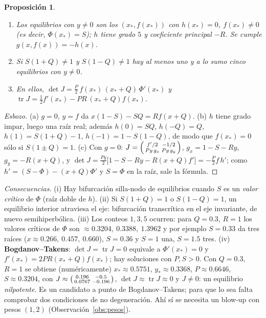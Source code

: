 \documentclass[11pt,a4paper]{article}
\newcommand{\tr}{\operatorname{tr}}
\theoremstyle{plain}
\newtheorem{proposicion}[teorema]{Proposición}
\theoremstyle{definition}
\theoremstyle{remark}
\begin{document}
\begin{proposicion}\label{prop:interior}
\begin{enumerate}[label=(\alph*)]
\item Los equilibrios con $y\ne0$ son los $(x_*,f(x_*))$ con $h(x_*)=0$, $f(x_*)\ne0$ (es decir, $\Phi(x_*)=S$); $h$ tiene grado $5$ y coeficiente principal $-R$. Se cumple $g(x,f(x))=-h(x)$.
\item Si $S(1+Q)\ne1$ y $S(1-Q)\ne1$ hay al menos uno y a lo sumo cinco equilibrios con $y\neq0$.
\item En ellos, $\det J=\tfrac P2\,f(x_*)\,(x_*+Q)\,\Phi'(x_*)$ y $\tr J=\tfrac12f'(x_*)-PR\,(x_*+Q)f(x_*)$.
\end{enumerate}
\end{proposicion}

\begin{proof}[Esbozo]
(a) $g=0$, $y=f$ da $x(1-S)-SQ=Rf(x+Q)$. (b) $h$ tiene grado impar, luego una raíz real; además $h(0)=SQ$, $h(-Q)=Q$, $h(1)=S(1+Q)-1$, $h(-1)=1-S(1-Q)$, de modo que $f(x_*)=0$ sólo si $S(1\pm Q)=1$. (c) Con $g=0$: $J=\begin{psmallmatrix}f'/2&-1/2\\Py\,g_x&Py\,g_y\end{psmallmatrix}$, $g_x=1-S-Ry$, $g_y=-R(x+Q)$, y $\det J=\tfrac{Py}2\big[1-S-Ry-R(x+Q)f'\big]=-\tfrac P2f\,h'$; como $h'=(S-\Phi)-(x+Q)\Phi'$ y $S=\Phi$ en la raíz, sale la fórmula.
\end{proof}

\emph{Consecuencias.} (i) Hay bifurcación silla-nodo de equilibrios cuando $S$ es un \emph{valor crítico} de $\Phi$ (raíz doble de $h$). (ii) Si $S(1+Q)=1$ o $S(1-Q)=1$, un equilibrio interior atraviesa el eje: bifurcación transcrítica en el eje invariante, de nuevo semihiperbólica. (iii) Los conteos $1,3,5$ ocurren: para $Q=0.3$, $R=1$ los valores críticos de $\Phi$ son $\approx0.3204,\ 0.3388,\ 1.3962$ y por ejemplo $S=0.33$ da tres raíces ($x\approx0.266,\ 0.457,\ 0.660$), $S=0.36$ y $S=1$ una, $S=1.5$ tres. (iv) \textbf{Bogdanov--Takens}: $\det J=\tr J=0$ equivale a $\Phi'(x_*)=0$ y $f'(x_*)=2PR(x_*+Q)f(x_*)$; hay soluciones con $P,S>0$. Con $Q=0.3$, $R=1$ se obtiene (numéricamente) $x_*\approx0.5751$, $y_*\approx0.3368$, $P\approx0.6646$, $S\approx0.3204$, con $J\approx\begin{psmallmatrix}0.196&-0.5\\0.0767&-0.196\end{psmallmatrix}$, $\det J\approx\tr J\approx0$ y $J\neq0$: un equilibrio \emph{nilpotente}. Es un candidato a punto de Bogdanov--Takens; para que lo sea falta comprobar dos condiciones de no degeneración. Ahí sí se necesita un blow-up con pesos $(1,2)$ (Observación~\ref{obs:pesos}).
\end{document}
